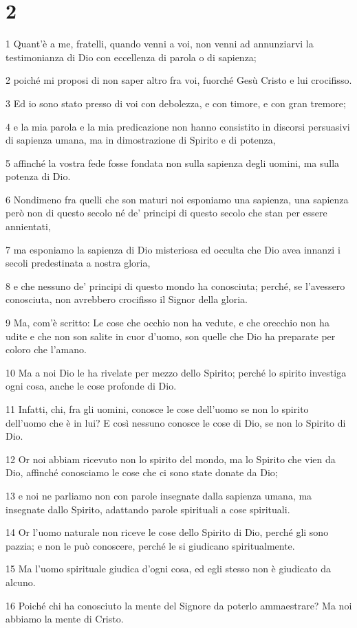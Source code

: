 \chapter{2}

\par 1 Quant'è a me, fratelli, quando venni a voi, non venni ad annunziarvi la testimonianza di Dio con eccellenza di parola o di sapienza;
\par 2 poiché mi proposi di non saper altro fra voi, fuorché Gesù Cristo e lui crocifisso.
\par 3 Ed io sono stato presso di voi con debolezza, e con timore, e con gran tremore;
\par 4 e la mia parola e la mia predicazione non hanno consistito in discorsi persuasivi di sapienza umana, ma in dimostrazione di Spirito e di potenza,
\par 5 affinché la vostra fede fosse fondata non sulla sapienza degli uomini, ma sulla potenza di Dio.
\par 6 Nondimeno fra quelli che son maturi noi esponiamo una sapienza, una sapienza però non di questo secolo né de' principi di questo secolo che stan per essere annientati,
\par 7 ma esponiamo la sapienza di Dio misteriosa ed occulta che Dio avea innanzi i secoli predestinata a nostra gloria,
\par 8 e che nessuno de' principi di questo mondo ha conosciuta; perché, se l'avessero conosciuta, non avrebbero crocifisso il Signor della gloria.
\par 9 Ma, com'è scritto: Le cose che occhio non ha vedute, e che orecchio non ha udite e che non son salite in cuor d'uomo, son quelle che Dio ha preparate per coloro che l'amano.
\par 10 Ma a noi Dio le ha rivelate per mezzo dello Spirito; perché lo spirito investiga ogni cosa, anche le cose profonde di Dio.
\par 11 Infatti, chi, fra gli uomini, conosce le cose dell'uomo se non lo spirito dell'uomo che è in lui? E così nessuno conosce le cose di Dio, se non lo Spirito di Dio.
\par 12 Or noi abbiam ricevuto non lo spirito del mondo, ma lo Spirito che vien da Dio, affinché conosciamo le cose che ci sono state donate da Dio;
\par 13 e noi ne parliamo non con parole insegnate dalla sapienza umana, ma insegnate dallo Spirito, adattando parole spirituali a cose spirituali.
\par 14 Or l'uomo naturale non riceve le cose dello Spirito di Dio, perché gli sono pazzia; e non le può conoscere, perché le si giudicano spiritualmente.
\par 15 Ma l'uomo spirituale giudica d'ogni cosa, ed egli stesso non è giudicato da alcuno.
\par 16 Poiché chi ha conosciuto la mente del Signore da poterlo ammaestrare? Ma noi abbiamo la mente di Cristo.

